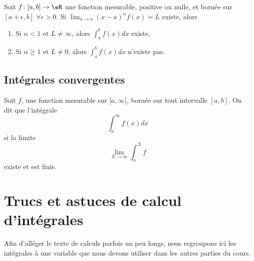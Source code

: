 \begin{corollary}		\label{CorAlphaLCasInteabf}
	Soit $f\colon ]a,b]\to \eR$ une fonction mesurable, positive ou nulle, et bornée sur $[a+\epsilon,b]$ $\forall\epsilon>0$. Si $\lim_{x\to a}(x-a)^{\alpha}f(x)=L$ existe, alors
	\begin{enumerate}
		\item Si $\alpha<1$ et $L\neq\infty$, alors $\int_a^bf(x)dx$ existe,
		\item Si $\alpha\geq 1$ et $L\neq 0$, alors $\int_a^bf(x)dx$ n'existe pas.
	\end{enumerate}
\end{corollary}

					\subsection{Intégrales convergentes}

\begin{definition}
    Soit $f$, une fonction mesurable sur $[a,\infty[$, bornée sur tout intervalle $[a,b]$. On dit que l'intégrale
    \begin{equation}
        \int_a^{\infty}f(x)dx
    \end{equation}
     si la limite
    \begin{equation}		\label{EqDEfConvergeZeroInftX}
        \lim_{X\to\infty}\int_a^{X}f
    \end{equation}
    existe et est finie.
\end{definition}

\section{Trucs et astuces de calcul d'intégrales}

Afin d'alléger le texte de calculs parfois un peu longs, nous regroupons ici les intégrales à une variable que nous devons utiliser dans les autres parties du cours.

